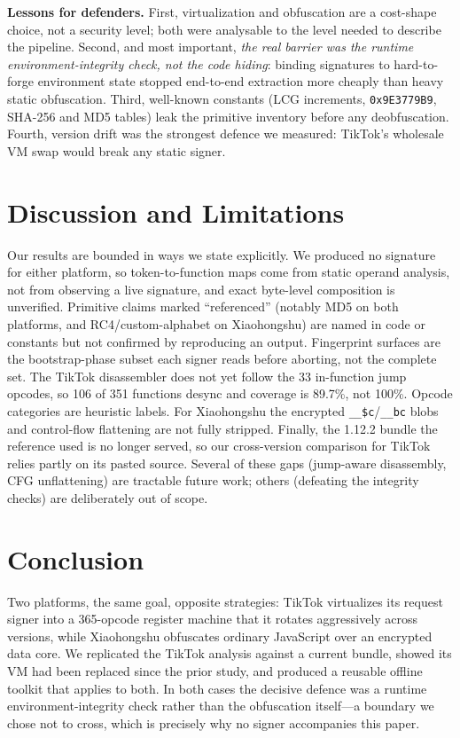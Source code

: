 \documentclass[conference,10pt]{IEEEtran}
\newcommand{\code}[1]{\texttt{\small #1}}
\begin{document}
\textbf{Lessons for defenders.} First, virtualization and obfuscation are a cost-shape choice, not a security level; both were analysable to the level needed to describe the pipeline. Second, and most important, \emph{the real barrier was the runtime environment-integrity check, not the code hiding}: binding signatures to hard-to-forge environment state stopped end-to-end extraction more cheaply than heavy static obfuscation. Third, well-known constants (LCG increments, \code{0x9E3779B9}, SHA-256 and MD5 tables) leak the primitive inventory before any deobfuscation. Fourth, version drift was the strongest defence we measured: TikTok's wholesale VM swap would break any static signer.

\section{Discussion and Limitations}
\label{sec:discussion}
Our results are bounded in ways we state explicitly. We produced no signature for either platform, so token-to-function maps come from static operand analysis, not from observing a live signature, and exact byte-level composition is unverified. Primitive claims marked ``referenced'' (notably MD5 on both platforms, and RC4/custom-alphabet on Xiaohongshu) are named in code or constants but not confirmed by reproducing an output. Fingerprint surfaces are the bootstrap-phase subset each signer reads before aborting, not the complete set. The TikTok disassembler does not yet follow the 33 in-function jump opcodes, so 106 of 351 functions desync and coverage is 89.7\%, not 100\%. Opcode categories are heuristic labels. For Xiaohongshu the encrypted \code{\_\_\$c}/\code{\_\_bc} blobs and control-flow flattening are not fully stripped. Finally, the 1.12.2 bundle the reference used is no longer served, so our cross-version comparison for TikTok relies partly on its pasted source. Several of these gaps (jump-aware disassembly, CFG unflattening) are tractable future work; others (defeating the integrity checks) are deliberately out of scope.

\section{Conclusion}
\label{sec:conclusion}
Two platforms, the same goal, opposite strategies: TikTok virtualizes its request signer into a 365-opcode register machine that it rotates aggressively across versions, while Xiaohongshu obfuscates ordinary JavaScript over an encrypted data core. We replicated the TikTok analysis against a current bundle, showed its VM had been replaced since the prior study, and produced a reusable offline toolkit that applies to both. In both cases the decisive defence was a runtime environment-integrity check rather than the obfuscation itself---a boundary we chose not to cross, which is precisely why no signer accompanies this paper.
\end{document}
